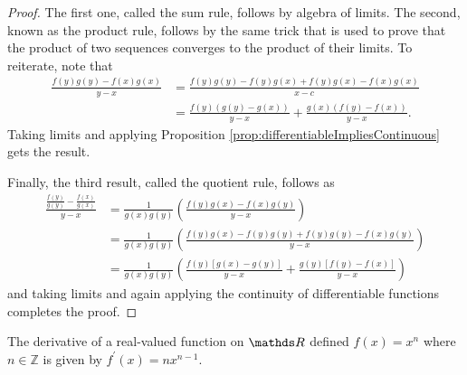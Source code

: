 \begin{proof}
The first one, called the sum rule, follows by algebra of limits.
The second, known as the product rule, follows by the same trick that
is used to prove that the product of two sequences converges to the
product of their limits. To reiterate, note that 
\begin{align*}
\frac{f\left(y\right)g\left(y\right)-f\left(x\right)g\left(x\right)}{y-x} & =\frac{f\left(y\right)g\left(y\right)-f\left(y\right)g\left(x\right)+f\left(y\right)g\left(x\right)-f\left(x\right)g\left(x\right)}{x-c}\\
 & =\frac{f\left(y\right)\left(g\left(y\right)-g\left(x\right)\right)}{y-x}+\frac{g\left(x\right)\left(f\left(y\right)-f\left(x\right)\right)}{y-x}.
\end{align*}
Taking limits and applying Proposition \ref{prop:differentiableImpliesContinuous}
gets the result.

Finally, the third result, called the quotient rule, follows as 
\begin{align*}
\frac{\frac{f\left(y\right)}{g\left(y\right)}-\frac{f\left(x\right)}{g\left(x\right)}}{y-x} & =\frac{1}{g\left(x\right)g\left(y\right)}\left(\frac{f\left(y\right)g\left(x\right)-f\left(x\right)g\left(y\right)}{y-x}\right)\\
 & =\frac{1}{g\left(x\right)g\left(y\right)}\left(\frac{f\left(y\right)g\left(x\right)-f\left(y\right)g\left(y\right)+f\left(y\right)g\left(y\right)-f\left(x\right)g\left(y\right)}{y-x}\right)\\
 & =\frac{1}{g\left(x\right)g\left(y\right)}\left(\frac{f\left(y\right)\left[g\left(x\right)-g\left(y\right)\right]}{y-x}+\frac{g\left(y\right)\left[f\left(y\right)-f\left(x\right)\right]}{y-x}\right)
\end{align*}
and taking limits and again applying the continuity of differentiable
functions completes the proof.
\end{proof}
\begin{cor}
\label{cor:powerRule}The derivative of a real-valued function on
$\R$ defined $f\left(x\right)=x^{n}$ where $n\in\mathds{Z}$ is
given by $f^{\prime}\left(x\right)=nx^{n-1}.$
\end{cor}

